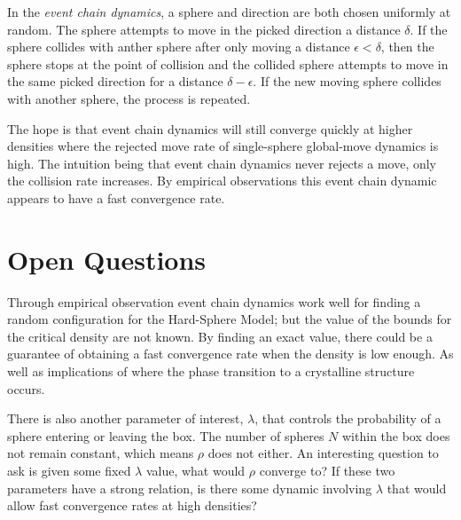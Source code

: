 \documentclass[a4paper,11pt]{article}
\begin{document}
In the \textit{event chain dynamics}, a sphere and direction are both chosen uniformly at random.  The sphere attempts to move in the picked direction a distance $\delta$.  If the sphere collides with anther sphere after only moving a distance $\epsilon < \delta$, then the sphere stops at the point of collision and the collided sphere attempts to move in the same picked direction for a distance $\delta - \epsilon$.  If the new moving sphere collides with another sphere, the process is repeated.

The hope is that event chain dynamics will still converge quickly at higher densities where the rejected move rate of single-sphere global-move dynamics is high.  The intuition being that event chain dynamics never rejects a move, only the collision rate increases.  By empirical observations this event chain dynamic appears to have a fast convergence rate.

\section*{Open Questions}

Through empirical observation event chain dynamics work well for finding a random configuration for the Hard-Sphere Model; but the value of the bounds for the critical density are not known.  By finding an exact value, there could be a guarantee of obtaining a fast convergence rate when the density is low enough. As well as implications of where the phase transition to a crystalline structure occurs.

There is also another parameter of interest, $\lambda$, that controls the probability of a sphere entering or leaving the box. The number of spheres $N$ within the box does not remain constant, which means $\rho$ does not either.  An interesting question to ask is given some fixed $\lambda$ value, what would $\rho$ converge to?  If these two parameters have a strong relation, is there some dynamic involving $\lambda$ that would allow fast convergence rates at high densities?
\end{document}
